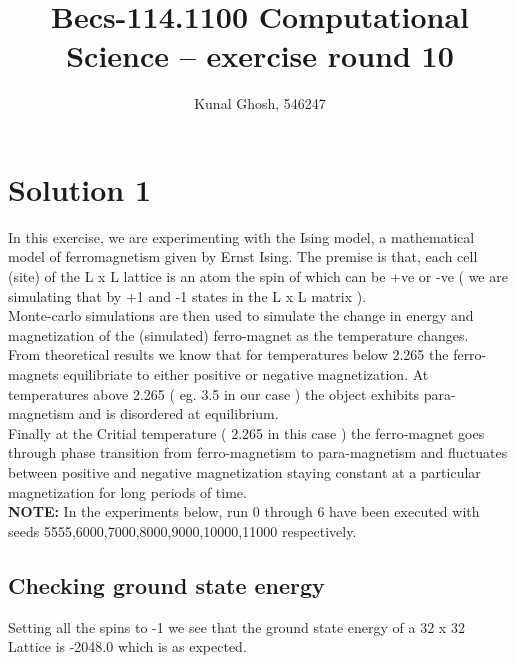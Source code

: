 \documentclass[a4paper,11pt]{article}
\begin{document}
\title{Becs-114.1100 Computational Science -- exercise round 10} %
\author{Kunal Ghosh, 546247} %
\maketitle
\section{Solution 1}\label{prob1}
In this exercise, we are experimenting with the Ising model, a mathematical model of ferromagnetism given by Ernst Ising. The premise is that, each cell (site) of the L x L lattice is an atom the spin of which can be +ve or -ve ( we are simulating that by +1 and -1 states in the L x L matrix ).\\
Monte-carlo simulations are then used to simulate the change in energy and magnetization of the (simulated) ferro-magnet as the temperature changes.\\
From theoretical results we know that for temperatures below 2.265 the ferro-magnets equilibriate to either positive or negative magnetization. At temperatures above 2.265 ( eg. 3.5 in our case ) the object exhibits para-magnetism and is disordered at equilibrium.\\
Finally at the Critial temperature ( 2.265 in this case ) the ferro-magnet goes through phase transition from ferro-magnetism to para-magnetism and fluctuates between positive and negative magnetization staying constant at a particular magnetization for long periods of time.
\\\textbf{NOTE:} In the experiments below, run 0 through 6 have been executed with \\ seeds 5555,6000,7000,8000,9000,10000,11000 respectively.
\clearpage
\subsection{Checking ground state energy}
Setting all the spins to -1 we see that the ground state energy of a 32 x 32 Lattice is -2048.0 which is as expected.
\end{document}
